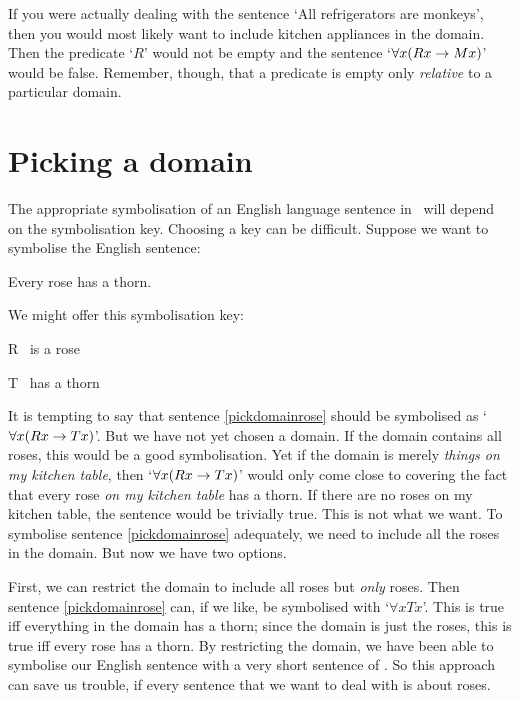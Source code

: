 If you were actually dealing with the sentence `All refrigerators are monkeys', then you would most likely want to include kitchen appliances in the domain. Then the predicate `$R$' would not be empty and the sentence `$\forall x(Rx \rightarrow Mx)$' would be false. Remember, though, that a predicate is empty only \emph{relative} to a particular domain. 

\section{Picking a domain}


The appropriate symbolisation of an English language sentence in \FOL\ will depend on the symbolisation key. Choosing a key can be difficult. Suppose we want to symbolise the English sentence:
	\begin{earg}
		\item[\ex{pickdomainrose}] Every rose has a thorn.
	\end{earg}
We might offer this symbolisation key:
	\begin{ekey}
		\item[R] \blank\ is a rose
		\item[T] \blank\ has a thorn
	\end{ekey}
It is tempting to say that sentence \ref{pickdomainrose} should be symbolised as `$\forall x(Rx \rightarrow Tx)$'. But we have not yet chosen a domain. If the domain contains all roses, this would be a good symbolisation. Yet if the domain is merely \emph{things on my kitchen table}, then `$\forall x(Rx \rightarrow Tx)$' would only come close to covering the fact that every rose \emph{on my kitchen table} has a thorn. If there are no roses on my kitchen table, the sentence would be trivially true. This is not what we want. To symbolise sentence \ref{pickdomainrose} adequately, we need to include all the roses in the domain. But now we have two options. 

First, we can restrict the domain to include all roses but \emph{only} roses. Then sentence \ref{pickdomainrose} can, if we like, be symbolised with `$\forall x Tx$'. This is true iff everything in the domain has a thorn; since the domain is just the roses, this is true iff every rose has a thorn. By restricting the domain, we have been able to symbolise our English sentence with a very short sentence of \FOL. So this approach can save us trouble, if every sentence that we want to deal with is about roses.

